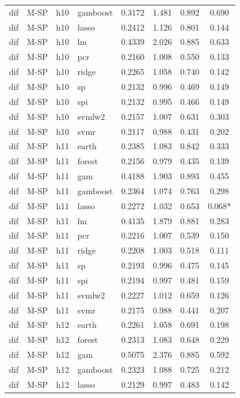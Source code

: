 \begin{ThreePartTable}
\begin{longtable}[t]{llclcccc}
dif & M-SP & h10 & gamboost & 0.3172 & 1.481 & 0.892 & 0.690\\
dif & M-SP & h10 & lasso & 0.2412 & 1.126 & 0.801 & 0.144\\
dif & M-SP & h10 & lm & 0.4339 & 2.026 & 0.885 & 0.633\\
dif & M-SP & h10 & pcr & 0.2160 & 1.008 & 0.550 & 0.133\\
dif & M-SP & h10 & ridge & 0.2265 & 1.058 & 0.740 & 0.142\\
dif & M-SP & h10 & sp & 0.2132 & 0.996 & 0.469 & 0.149\\
dif & M-SP & h10 & spi & 0.2132 & 0.995 & 0.466 & 0.149\\
dif & M-SP & h10 & svmlw2 & 0.2157 & 1.007 & 0.631 & 0.303\\
dif & M-SP & h10 & svmr & 0.2117 & 0.988 & 0.431 & 0.202\\
\addlinespace
dif & M-SP & h11 & earth & 0.2385 & 1.083 & 0.842 & 0.333\\
dif & M-SP & h11 & forest & 0.2156 & 0.979 & 0.435 & 0.139\\
dif & M-SP & h11 & gam & 0.4188 & 1.903 & 0.893 & 0.455\\
dif & M-SP & h11 & gamboost & 0.2364 & 1.074 & 0.763 & 0.298\\
dif & M-SP & h11 & lasso & 0.2272 & 1.032 & 0.653 & 0.068*\\
dif & M-SP & h11 & lm & 0.4135 & 1.879 & 0.881 & 0.283\\
dif & M-SP & h11 & pcr & 0.2216 & 1.007 & 0.539 & 0.150\\
dif & M-SP & h11 & ridge & 0.2208 & 1.003 & 0.518 & 0.111\\
dif & M-SP & h11 & sp & 0.2193 & 0.996 & 0.475 & 0.145\\
dif & M-SP & h11 & spi & 0.2194 & 0.997 & 0.481 & 0.159\\
dif & M-SP & h11 & svmlw2 & 0.2227 & 1.012 & 0.659 & 0.126\\
dif & M-SP & h11 & svmr & 0.2175 & 0.988 & 0.441 & 0.207\\
\addlinespace
dif & M-SP & h12 & earth & 0.2261 & 1.058 & 0.691 & 0.198\\
dif & M-SP & h12 & forest & 0.2313 & 1.083 & 0.648 & 0.229\\
dif & M-SP & h12 & gam & 0.5075 & 2.376 & 0.885 & 0.592\\
dif & M-SP & h12 & gamboost & 0.2323 & 1.088 & 0.725 & 0.212\\
dif & M-SP & h12 & lasso & 0.2129 & 0.997 & 0.483 & 0.142\\

\end{longtable}
\end{ThreePartTable}
